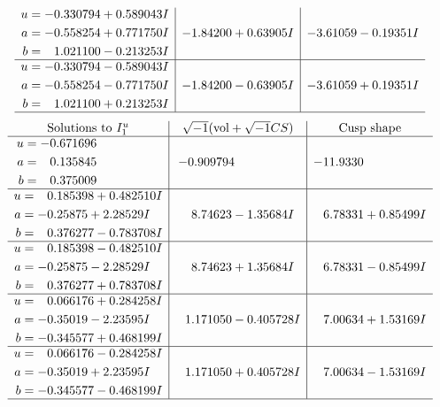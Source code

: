 \documentclass[1p]{elsarticle_modified}
\theoremstyle{definition}
\newcommand{\I}{\sqrt{-1}}
\begin{document}
$$\begin{array}{c|c|c}
\begin{aligned}
u &= -0.330794 + 0.589043 I \\
a &= -0.558254 + 0.771750 I \\
b &= \phantom{-}1.021100 - 0.213253 I\end{aligned}
 & -1.84200 + 0.63905 I & -3.61059 - 0.19351 I \\ \hline\begin{aligned}
u &= -0.330794 - 0.589043 I \\
a &= -0.558254 - 0.771750 I \\
b &= \phantom{-}1.021100 + 0.213253 I\end{aligned}
 & -1.84200 - 0.63905 I & -3.61059 + 0.19351 I\\
 \hline 
 \end{array}$$\newpage$$\begin{array}{c|c|c}  
\text{Solutions to }I^u_{1}& \I (\text{vol} + \sqrt{-1}CS) & \text{Cusp shape}\\
 \hline 
\begin{aligned}
u &= -0.671696\phantom{ +0.000000I} \\
a &= \phantom{-}0.135845\phantom{ +0.000000I} \\
b &= \phantom{-}0.375009\phantom{ +0.000000I}\end{aligned}
 & -0.909794\phantom{ +0.000000I} & -11.9330\phantom{ +0.000000I} \\ \hline\begin{aligned}
u &= \phantom{-}0.185398 + 0.482510 I \\
a &= -0.25875 + 2.28529 I \\
b &= \phantom{-}0.376277 - 0.783708 I\end{aligned}
 & \phantom{-}8.74623 - 1.35684 I & \phantom{-}6.78331 + 0.85499 I \\ \hline\begin{aligned}
u &= \phantom{-}0.185398 - 0.482510 I \\
a &= -0.25875 - 2.28529 I \\
b &= \phantom{-}0.376277 + 0.783708 I\end{aligned}
 & \phantom{-}8.74623 + 1.35684 I & \phantom{-}6.78331 - 0.85499 I \\ \hline\begin{aligned}
u &= \phantom{-}0.066176 + 0.284258 I \\
a &= -0.35019 - 2.23595 I \\
b &= -0.345577 + 0.468199 I\end{aligned}
 & \phantom{-}1.171050 - 0.405728 I & \phantom{-}7.00634 + 1.53169 I \\ \hline\begin{aligned}
u &= \phantom{-}0.066176 - 0.284258 I \\
a &= -0.35019 + 2.23595 I \\
b &= -0.345577 - 0.468199 I\end{aligned}
 & \phantom{-}1.171050 + 0.405728 I & \phantom{-}7.00634 - 1.53169 I\\
 \hline 
 \end{array}$$\newpage\newpage\renewcommand{\arraystretch}{1}
\end{document}
